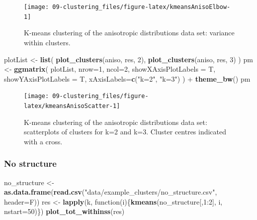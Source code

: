 \documentclass[]{book}
\newenvironment{Shaded}{\begin{snugshade}}{\end{snugshade}}
\newcommand{\KeywordTok}[1]{\textcolor[rgb]{0.13,0.29,0.53}{\textbf{{#1}}}}
\newcommand{\DataTypeTok}[1]{\textcolor[rgb]{0.13,0.29,0.53}{{#1}}}
\newcommand{\DecValTok}[1]{\textcolor[rgb]{0.00,0.00,0.81}{{#1}}}
\newcommand{\StringTok}[1]{\textcolor[rgb]{0.31,0.60,0.02}{{#1}}}
\newcommand{\NormalTok}[1]{{#1}}
\theoremstyle{definition}
\theoremstyle{definition}
\theoremstyle{definition}
\theoremstyle{remark}
\begin{document}
\begin{figure}

{\centering \texttt{[image: 09-clustering\_files/figure-latex/kmeansAnisoElbow-1]} 

}

\caption{K-means clustering  of the anisotropic distributions data set: variance within clusters.}\label{fig:kmeansAnisoElbow}
\end{figure}

\begin{Shaded}
\begin{Highlighting}[]
\NormalTok{plotList <-}\StringTok{ }\KeywordTok{list}\NormalTok{(}
  \KeywordTok{plot_clusters}\NormalTok{(aniso, res, }\DecValTok{2}\NormalTok{),}
  \KeywordTok{plot_clusters}\NormalTok{(aniso, res, }\DecValTok{3}\NormalTok{)}
\NormalTok{)}
\NormalTok{pm <-}\StringTok{ }\KeywordTok{ggmatrix}\NormalTok{(}
  \NormalTok{plotList, }\DataTypeTok{nrow=}\DecValTok{1}\NormalTok{, }\DataTypeTok{ncol=}\DecValTok{2}\NormalTok{, }\DataTypeTok{showXAxisPlotLabels =} \NormalTok{T, }
  \DataTypeTok{showYAxisPlotLabels =} \NormalTok{T, }\DataTypeTok{xAxisLabels=}\KeywordTok{c}\NormalTok{(}\StringTok{"k=2"}\NormalTok{, }\StringTok{"k=3"}\NormalTok{)}
\NormalTok{) +}\StringTok{ }\KeywordTok{theme_bw}\NormalTok{()}
\NormalTok{pm}
\end{Highlighting}
\end{Shaded}

\begin{figure}

{\centering \texttt{[image: 09-clustering\_files/figure-latex/kmeansAnisoScatter-1]} 

}

\caption{K-means clustering of the anisotropic distributions data set: scatterplots of clusters for k=2 and k=3. Cluster centres indicated with a cross.}\label{fig:kmeansAnisoScatter}
\end{figure}

\subsubsection{No structure}\label{no-structure}

\begin{Shaded}
\begin{Highlighting}[]
\NormalTok{no_structure <-}\StringTok{ }\KeywordTok{as.data.frame}\NormalTok{(}\KeywordTok{read.csv}\NormalTok{(}\StringTok{"data/example_clusters/no_structure.csv"}\NormalTok{, }\DataTypeTok{header=}\NormalTok{F))}
\NormalTok{res <-}\StringTok{ }\KeywordTok{lapply}\NormalTok{(k, function(i)\{}\KeywordTok{kmeans}\NormalTok{(no_structure[,}\DecValTok{1}\NormalTok{:}\DecValTok{2}\NormalTok{], i, }\DataTypeTok{nstart=}\DecValTok{50}\NormalTok{)\})}
\KeywordTok{plot_tot_withinss}\NormalTok{(res)}
\end{Highlighting}
\end{Shaded}
\end{document}
